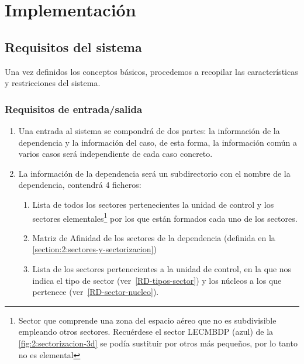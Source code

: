
\section{Implementación}


\subsection{Requisitos del sistema}
Una vez definidos los conceptos básicos, procedemos a recopilar las características y restricciones del sistema.

\subsubsection{Requisitos de entrada/salida}

\begin{enumerate}[label={\textbf{RIO\arabic*}}]
	\item  Una entrada al sistema se compondrá de dos partes: la información de la dependencia y la información del caso,
	de esta forma, la información común a varios casos será independiente de cada caso concreto.
	\item La información de la dependencia será un subdirectorio con el nombre de la dependencia, contendrá 4 ficheros:
	\begin{enumerate}[label*={\textbf{.\arabic*}}]
		\item  Lista de todos los sectores pertenecientes la unidad de control y los sectores elementales\footnote{
			Sector que comprende una zona del espacio aéreo que no es subdivisible empleando otros sectores. Recuérdese el sector LECMBDP (azul) de la \autoref{fig:2:sectorizacion-3d} se podía sustituir por otros más pequeños, por lo tanto no es elemental
		} por los que están formados cada uno de los sectores.
		
		\item  Matriz de Afinidad de los sectores de la dependencia (definida en la \autoref{section:2:sectores-y-sectorizacion})
		\item Lista de los sectores pertenecientes a la unidad de control, en la que nos indica el tipo de sector (ver~\ref{RD-tipos-sector}) y los núcleos a los que pertenece (ver~\ref{RD-sector-nucleo}).
	\end{enumerate}
	
\end{enumerate}


